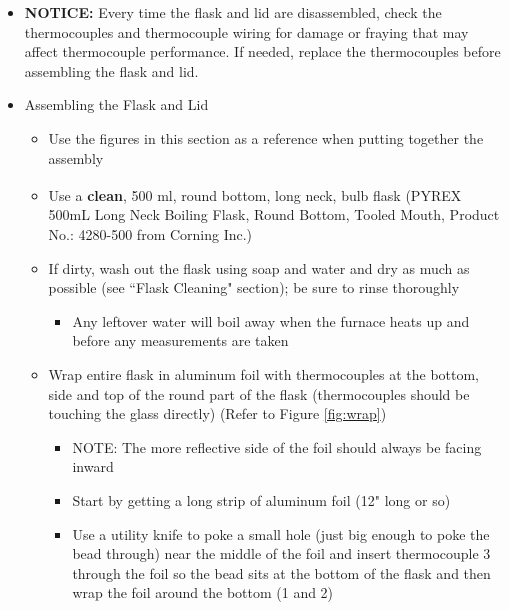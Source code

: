 \documentclass[letterpaper,11pt]{article}
\begin{document}
\begin{itemize}
    \item \textbf{NOTICE:} Every time the flask and lid are disassembled, check 
        the thermocouples and thermocouple wiring for damage or fraying that 
        may affect thermocouple performance. If needed, replace the 
        thermocouples before assembling the flask and lid.


    \item Assembling the Flask and Lid 
        \begin{itemize}
        \item Use the figures in this section as a reference when putting 
            together the assembly
        
        \item Use a \textbf{clean}, 500 ml, round bottom, long neck, bulb flask 
            (PYREX\textsuperscript{\textcopyright} 500mL Long Neck Boiling 
            Flask, Round Bottom, Tooled Mouth, Product No.: 4280-500 from 
            Corning Inc.)
        \item If dirty, wash out the flask using soap and water and dry as much 
            as possible (see ``Flask Cleaning" section); be sure to rinse
            thoroughly
                \begin{itemize}
                \item Any leftover water will boil away when the furnace heats 
                up and before any measurements are taken
                \end{itemize}        
        \item Wrap entire flask in aluminum foil with thermocouples at the 
            bottom, side and top of the round part of the flask (thermocouples 
            should be touching the glass directly) (Refer to Figure 
            \ref{fig:wrap})
                \begin{itemize}
                \item NOTE: The more reflective side of the foil should always 
                    be facing inward
                \item Start by getting a long strip of aluminum foil (12" long 
                    or so)
                \item Use a utility knife to poke a small hole (just big enough 
                    to poke the bead through) near the middle of 
                    the foil and insert thermocouple 3 through the foil so the 
                    bead sits at the bottom of the flask and then wrap the foil 
                    around the bottom (1 and 2)

\end{itemize}
\end{itemize}
\end{itemize}
\end{document}
